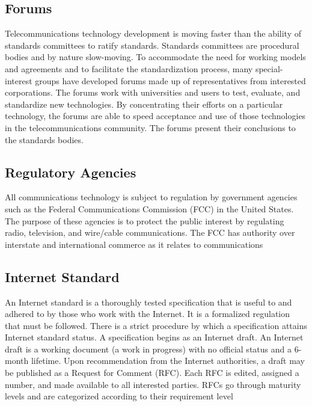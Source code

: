 \subsection*{Forums}
Telecommunications technology development is moving faster than the ability of standards committees to ratify standards. Standards committees are procedural bodies and by nature slow-moving. To accommodate the need for working models and agreements and to facilitate the standardization process, many special-interest groups have developed forums made up of representatives from interested corporations. The forums work with universities and users to test, evaluate, and standardize new technologies. By concentrating their efforts on a particular technology, the forums are able to speed acceptance and use of those technologies in the telecommunications community. The forums present their conclusions to the standards bodies.

\subsection*{Regulatory Agencies}
All communications technology is subject to regulation by government agencies such as the Federal Communications Commission (FCC) in the United States. The purpose of these agencies is to protect the public interest by regulating radio, television, and wire/cable communications. The FCC has authority over interstate and international commerce as it relates to communications

\subsection{Internet Standard}
An Internet standard is a thoroughly tested specification that is useful to and adhered to by those who work with the Internet. It is a formalized regulation that must be followed. There is a strict procedure by which a specification attains Internet standard status. A specification begins as an Internet draft. An Internet draft is a working document (a work in progress) with no official status and a 6-month lifetime. Upon recommendation from the Internet authorities, a draft may be published as a Request for Comment (RFC). Each RFC is edited, assigned a number, and made available to all interested parties. RFCs go through maturity levels and are categorized according to their requirement level

